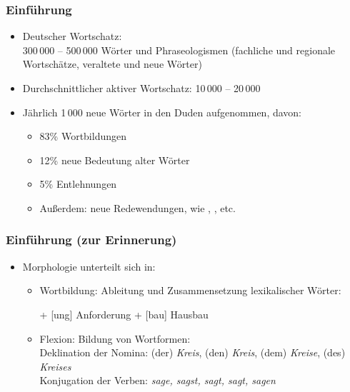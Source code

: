 \begin{frame}
\frametitle{Einführung}

\begin{itemize}
	\item Deutscher Wortschatz: \\
300\,000 – 500\,000 Wörter und Phraseologismen (fachliche und regionale Wortschätze, veraltete und neue Wörter)
	\item Durchschnittlicher aktiver Wortschatz:
10\,000 – 20\,000
	\item Jährlich 1\,000 neue Wörter in den Duden aufgenommen, davon:
	
	\begin{itemize}
		\item 83\% Wortbildungen
		\item 12\% neue Bedeutung alter Wörter
		\item 5\% Entlehnungen
		\item Außerdem: neue Redewendungen, wie \zB {}, , etc.
	\end{itemize}
\end{itemize}


\end{frame}


\begin{frame}
\frametitle{Einführung (zur Erinnerung)}

\begin{itemize}
	\item Morphologie unterteilt sich in:
	
	\begin{itemize}
		\item Wortbildung: Ableitung und Zusammensetzung lexikalischer Wörter:
		
		\eal 
			\ex [anforder(n)] + [ung] \ras Anforderung
			\ex [Haus] + [bau] \ras Hausbau
		\zl
		
		\item Flexion: Bildung von Wortformen: \\
		Deklination der Nomina: (der) \emph{Kreis}, (den) \emph{Kreis}, (dem) \emph{Kreise}, (des) \emph{Kreises} \\
		Konjugation der Verben: \emph{sage, sagst, sagt, sagt, sagen}			 
	\end{itemize}	
\end{itemize}


\end{frame}


